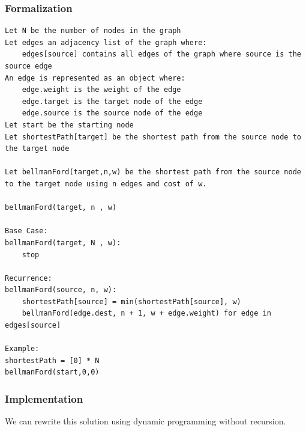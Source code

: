 \documentclass[11pt,oneside]{book}
\begin{document}
\subsubsection{Formalization}

\begin{lstlisting}
Let N be the number of nodes in the graph
Let edges an adjacency list of the graph where:
    edges[source] contains all edges of the graph where source is the source edge
An edge is represented as an object where:
    edge.weight is the weight of the edge
    edge.target is the target node of the edge
    edge.source is the source node of the edge
Let start be the starting node
Let shortestPath[target] be the shortest path from the source node to the target node

Let bellmanFord(target,n,w) be the shortest path from the source node to the target node using n edges and cost of w.

bellmanFord(target, n , w)

Base Case:
bellmanFord(target, N , w):
    stop

Recurrence:
bellmanFord(source, n, w):
    shortestPath[source] = min(shortestPath[source], w)
    bellmanFord(edge.dest, n + 1, w + edge.weight) for edge in edges[source]

Example:
shortestPath = [0] * N
bellmanFord(start,0,0)
\end{lstlisting}

\subsubsection{Implementation}

We can rewrite this solution using dynamic programming without recursion.
\end{document}
